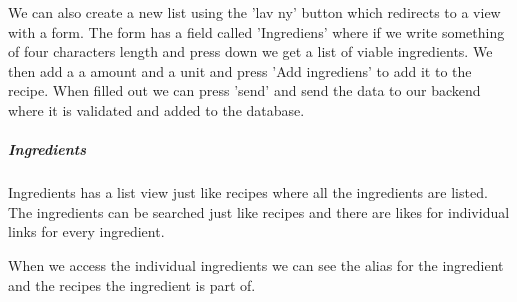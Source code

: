 \documentclass{article}
\begin{document}
We can also create a new list using the 'lav ny' button which redirects to a
view with a form. The form has a field called 'Ingrediens' where if we write
something of four characters length and press down we get a list of viable
ingredients. We then add a a amount and a unit and press 'Add ingrediens' to add
it to the recipe. When filled out we can press 'send' and send the data to our
backend where it is validated and added to the database.

\subparagraph{Ingredients}
Ingredients has a list view just like recipes where all the ingredients are
listed. The ingredients can be searched just like recipes and there are likes
for individual links for every ingredient.

When we access the individual ingredients we can see the alias for the
ingredient and the recipes the ingredient is part of. 
\end{document}
